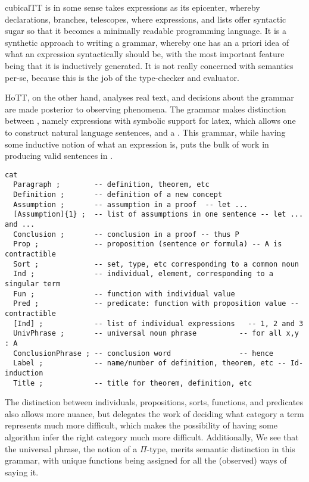 cubicalTT is in some sense takes expressions as its epicenter, whereby
declarations, branches, telescopes, where expressions, and lists offer syntactic
sugar so that it becomes a minimally readable programming language. It is a
synthetic approach to writing a grammar, whereby one has an a priori idea of
what an expression syntactically should be, with the most important feature
being that it is inductively generated. It is not really concerned with
semantics per-se, because this is the job of the type-checker and evaluator.

HoTT, on the other hand, analyses real text, and decisions about the grammar are
made posterior to observing phenomena.  The grammar makes distinction between
, namely expressions with symbolic support for latex, 
 which allows one to construct natural language sentences,
and a . This grammar, while having some inductive notion
of what an expression is, puts the bulk of work in producing valid sentences in .

\begin{verbatim}
cat
  Paragraph ;        -- definition, theorem, etc
  Definition ;       -- definition of a new concept
  Assumption ;       -- assumption in a proof  -- let ...
  [Assumption]{1} ;  -- list of assumptions in one sentence -- let ... and ...
  Conclusion ;       -- conclusion in a proof -- thus P
  Prop ;             -- proposition (sentence or formula) -- A is contractible
  Sort ;             -- set, type, etc corresponding to a common noun
  Ind ;              -- individual, element, corresponding to a singular term
  Fun ;              -- function with individual value
  Pred ;             -- predicate: function with proposition value -- contractible
  [Ind] ;            -- list of individual expressions   -- 1, 2 and 3
  UnivPhrase ;       -- universal noun phrase          -- for all x,y : A
  ConclusionPhrase ; -- conclusion word                -- hence
  Label ;            -- name/number of definition, theorem, etc -- Id-induction
  Title ;            -- title for theorem, definition, etc
\end{verbatim}

The distinction between individuals, propositions,
sorts, functions, and predicates also allows more nuance, but delegates the work
of deciding what category a term represents much more difficult, which makes the
possibility of having some algorithm infer the right category much more
difficult.  Additionally, 
We see that the universal phrase, the notion of a $\Pi$-type, merits semantic 
distinction in this grammar, with unique functions being assigned for all the
(observed) ways of saying it.

